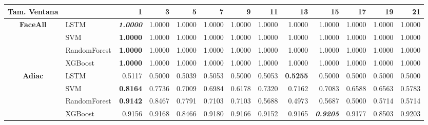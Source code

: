 \begin{table}[H]
	\centering
	\begin{adjustbox}{max width=12cm}
		\begin{tabular}{|c|l|r|r|r|r|r|r|r|r|r|r|r|}
			\hline
			\textbf{Tam. Ventana} &              & 1                        & 3      & 5               & 7      & 9               & 11     & 13              & 15                       & 17                       & 19              & 21     \\
			\hline
			\textbf{FaceAll}      & LSTM         & \textit{\textbf{1.0000}} & 1.0000 & 1.0000          & 1.0000 & 1.0000          & 1.0000 & 1.0000          & 1.0000                   & 1.0000                   & 1.0000          & 1.0000 \\
			                      & SVM          & \textbf{1.0000}          & 1.0000 & 1.0000          & 1.0000 & 1.0000          & 1.0000 & 1.0000          & 1.0000                   & 1.0000                   & 1.0000          & 1.0000 \\
			                      & RandomForest & \textbf{1.0000}          & 1.0000 & 1.0000          & 1.0000 & 1.0000          & 1.0000 & 1.0000          & 1.0000                   & 1.0000                   & 1.0000          & 1.0000 \\
			                      & XGBoost      & \textbf{1.0000}          & 1.0000 & 1.0000          & 1.0000 & 1.0000          & 1.0000 & 1.0000          & 1.0000                   & 1.0000                   & 1.0000          & 1.0000 \\
			\hline
			\textbf{Adiac}        & LSTM         & 0.5117                   & 0.5000 & 0.5039          & 0.5053 & 0.5000          & 0.5053 & \textbf{0.5255} & 0.5000                   & 0.5000                   & 0.5000          & 0.5000 \\
			                      & SVM          & \textbf{0.8164}          & 0.7736 & 0.7009          & 0.6984 & 0.6178          & 0.7320 & 0.7162          & 0.7083                   & 0.6588                   & 0.6563          & 0.5783 \\
			                      & RandomForest & \textbf{0.9142}          & 0.8467 & 0.7791          & 0.7103 & 0.7103          & 0.5688 & 0.4973          & 0.5687                   & 0.5000                   & 0.5714          & 0.5714 \\
			                      & XGBoost      & 0.9156                   & 0.9168 & 0.8466          & 0.9180 & 0.9166          & 0.9152 & 0.9165          & \textit{\textbf{0.9205}} & 0.9177                   & 0.8503          & 0.9203 \\

\end{tabular}
\end{adjustbox}
\end{table}
